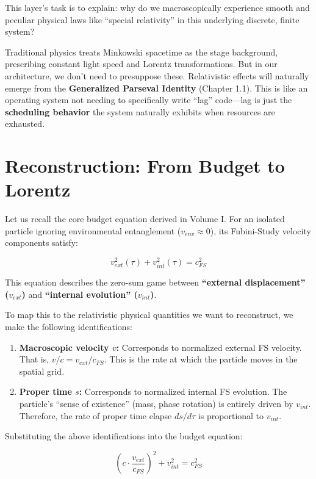 \documentclass[11pt,a4paper,twoside]{book}
\begin{document}
This layer's task is to explain: why do we macroscopically experience smooth and peculiar physical laws like ``special relativity'' in this underlying discrete, finite system?

Traditional physics treats Minkowski spacetime as the stage background, prescribing constant light speed and Lorentz transformations. But in our architecture, we don't need to presuppose these. Relativistic effects will naturally emerge from the \textbf{Generalized Parseval Identity} (Chapter 1.1). This is like an operating system not needing to specifically write ``lag'' code---lag is just the \textbf{scheduling behavior} the system naturally exhibits when resources are exhausted.

\section{Reconstruction: From Budget to Lorentz}

Let us recall the core budget equation derived in Volume I. For an isolated particle ignoring environmental entanglement (\textbf{$v_{env} \approx 0$}), its Fubini-Study velocity components satisfy:

$$v_{ext}^2(\tau) + v_{int}^2(\tau) = c_{FS}^2$$

This equation describes the zero-sum game between \textbf{``external displacement'' ($v_{ext}$)} and \textbf{``internal evolution'' ($v_{int}$)}.

To map this to the relativistic physical quantities we want to reconstruct, we make the following identifications:

\begin{enumerate}
\item \textbf{Macroscopic velocity $v$:} Corresponds to normalized external FS velocity. That is, \textbf{$v/c = v_{ext}/c_{FS}$}. This is the rate at which the particle moves in the spatial grid.

\item \textbf{Proper time $s$:} Corresponds to normalized internal FS evolution. The particle's ``sense of existence'' (mass, phase rotation) is entirely driven by \textbf{$v_{int}$}. Therefore, the rate of proper time elapse \textbf{$ds/d\tau$} is proportional to \textbf{$v_{int}$}.
\end{enumerate}

Substituting the above identifications into the budget equation:

$$(c \cdot \frac{v_{ext}}{c_{FS}})^2 + v_{int}^2 = c_{FS}^2$$
\end{document}
